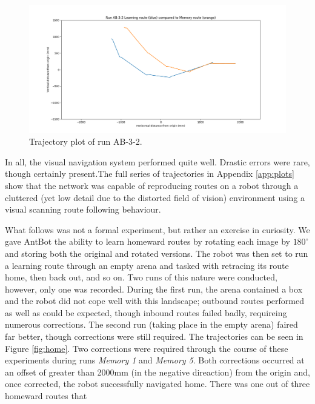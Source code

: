 \documentclass[a4paper,12pt]{article}
\begin{document}
\begin{figure}
 \centering
  \includegraphics[width=\textwidth]{AB-3-2}
  \caption{
    \label{fig:ab-3-2} Trajectory plot of run AB-3-2.
  }
\end{figure}

In all, the visual navigation system performed quite well. Drastic errors were rare, though certainly present.The full series
of trajectories in Appendix \ref{app:plots} show that the network was capable of reproducing routes on a robot through a
cluttered (yet low detail due to the distorted field of vision) environment using a visual scanning route following behaviour.
\newline

What follows was not a formal experiment, but rather an exercise in curiosity. We gave AntBot the ability to learn homeward
routes by rotating each image by $180^{\circ}$ and storing both the original and rotated versions. The robot was then set
to run a learning route through an empty arena and tasked with retracing its route home, then back out, and so on. Two runs
of this nature were conducted, however, only one was recorded. During the first run, the arena contained a box and the
robot did not cope well with this landscape; outbound routes performed as well as could be expected, though inbound routes
failed badly, requireing numerous corrections. The second run (taking place in the empty arena) faired far better, though
corrections were still required. The trajectories can be seen in Figure \ref{fig:home}. Two corrections were required
through the course of these experiments during runs \textit{Memory 1} and \textit{Memory 5}. Both corrections occurred
at an offset of greater than 2000mm (in the negative direaction) from the origin and, once corrected, the robot successfully
navigated home. There was one out of three homeward routes that  
\end{document}
